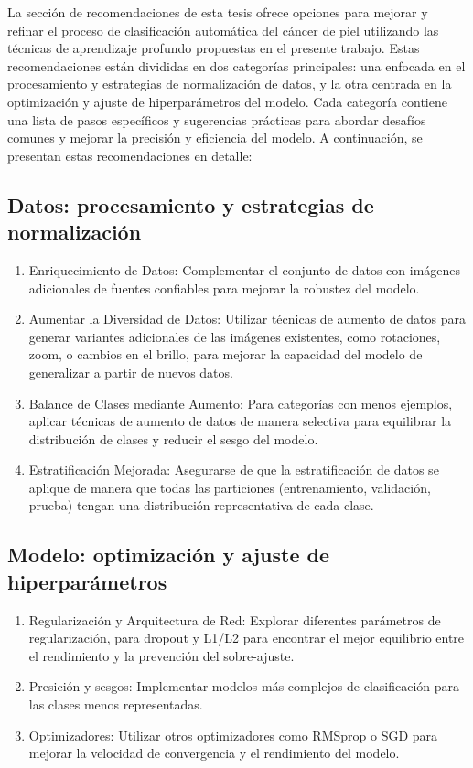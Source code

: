 \begin{recomendations}

La sección de recomendaciones de esta tesis ofrece opciones para mejorar y refinar el proceso de clasificación automática del cáncer de piel utilizando las técnicas de aprendizaje profundo propuestas en el presente trabajo. Estas recomendaciones están divididas en dos categorías principales: una enfocada en el procesamiento y estrategias de normalización de datos, y la otra centrada en la optimización y ajuste de hiperparámetros del modelo. Cada categoría contiene una lista de pasos específicos y sugerencias prácticas para abordar desafíos comunes y mejorar la precisión y eficiencia del modelo. A continuación, se presentan estas recomendaciones en detalle:
\subsection*{Datos: procesamiento y estrategias de normalización}

\begin{enumerate}
    \item Enriquecimiento de Datos: Complementar el conjunto de datos con imágenes adicionales de fuentes confiables para mejorar la robustez del modelo.
    \item Aumentar la Diversidad de Datos: Utilizar técnicas de aumento de datos para generar variantes adicionales de las imágenes existentes, como rotaciones, zoom, o cambios en el brillo, para mejorar la capacidad del modelo de generalizar a partir de nuevos datos.
    \item Balance de Clases mediante Aumento: Para categorías con menos ejemplos, aplicar técnicas de aumento de datos de manera selectiva para equilibrar la distribución de clases y reducir el sesgo del modelo.
    \item Estratificación Mejorada: Asegurarse de que la estratificación de datos se aplique de manera que todas las particiones (entrenamiento, validación, prueba) tengan una distribución representativa de cada clase.
\end{enumerate}

\subsection*{Modelo: optimización y ajuste de hiperparámetros}

\begin{enumerate}
    \item Regularización y Arquitectura de Red: Explorar diferentes parámetros de regularización, para dropout y L1/L2 para encontrar el mejor equilibrio entre el rendimiento y la prevención del sobre-ajuste.
    \item Presición y sesgos: Implementar modelos más complejos de clasificación para las clases menos representadas.
    \item Optimizadores: Utilizar otros optimizadores como RMSprop o SGD para mejorar la velocidad de convergencia y el rendimiento del modelo.
\end{enumerate}

\end{recomendations}
